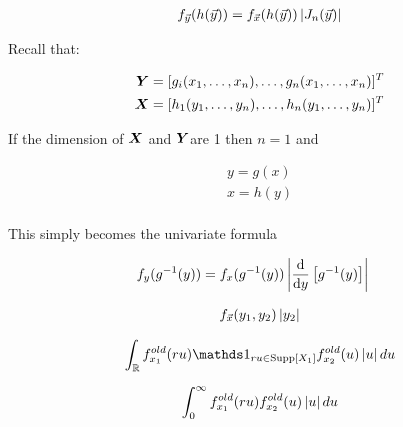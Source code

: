 \documentclass[12pt]{article}
\begin{document}
\begin{enumerate}


\begin{align*}
    f_{\vec{y}}(h(\vec{y})) = f_{\vec{x}}(h(\vec{y}))\left|J_n(\vec{y})\right|
\end{align*}


Recall that:

\begin{align*}
    \boldsymbol{Y} &= [g_i(x_1, \ldots, x_n), \ldots, g_n(x_1, \ldots, x_n)]^T \\ 
    \boldsymbol{X} &= [h_1(y_1,\ldots,y_n), \ldots, h_n(y_1, \ldots, y_n)]^T
\end{align*}

If the dimension of $\boldsymbol{X}$ and $\boldsymbol{Y}$are 1 then $n=1$ and

\begin{align*}
    y = g(x) \\
    x = h(y) \\
\end{align*}

This simply becomes the univariate formula

\begin{align*}
    f_y(g^{-1}(y)) &= f_x(g^{-1}(y))\left|\dfrac{\text{d}}{\text{d} y}\left[g^{-1}(y)\right] \right|
\end{align*}


\begin{align*}
    f_{\vec{x}}(y_1, y_2)\left|y_2\right| 
\end{align*}

 
\begin{align*}
    \int_{\reals} f_{x_1}^{old}(ru) \indic{ru \in \support{X_1}} f_{x_2}^{old}(u)\abss{u} du
\end{align*}


\begin{align*}
    \int_{0}^{\infty} f_{x_1}^{old}(ru) f_{x_2}^{old}(u)\left|u\right| du
\end{align*}


\end{enumerate}
\end{document}
